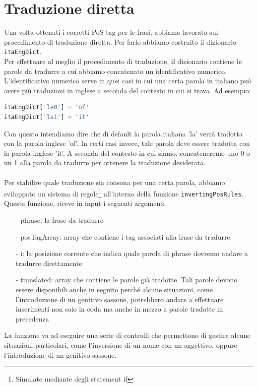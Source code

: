 \documentclass[10pt]{article}
\begin{document}
\section{Traduzione diretta}
Una volta ottenuti i corretti PoS tag per le frasi, abbiamo lavorato sul procedimento di traduzione diretta. Per farlo abbiamo costruito il dizionario \texttt{itaEngDict}.\\
Per effettuare al meglio il procedimento di traduzione, il dizionario contiene le parole da tradurre a cui abbiamo concatenato un identificativo numerico. L'identificativo numerico serve in quei casi in cui una certa parola in italiano può avere più traduzioni in inglese a seconda del contesto in cui si trova. Ad esempio:
\begin{lstlisting}[language=Python]
itaEngDict['la0'] = 'of'
itaEngDict['la1'] = 'it'
\end{lstlisting}
Con questo intendiamo dire che di default la parola italiana 'la' verrà tradotta con la parola inglese 'of'. In certi casi invece, tale parola deve essere tradotta con la parola inglese 'it'. A seconda del contesto in cui siamo, concateneremo uno 0 o un 1 alla parola da tradurre per ottenere la traduzione desiderata.\\
\\
Per stabilire quale traduzione sia consona per una certa parola, abbiamo sviluppato un sistema di regole\footnote{Simulate mediante degli statement if} all'interno della funzione \texttt{invertingPosRules}. Questa funzione, riceve in input i seguenti argomenti
\begin{itemize}
	\item[-] phrase: la frase da tradurre
	\item[-] posTagArray: array che contiene i tag associati alla frase da tradurre
	\item[-] i: la posizione corrente che indica quale parola di phrase dovremo andare a tradurre direttamente
	\item[-] translated: array che contiene le parole già tradotte. Tali parole devono essere disponibili anche in seguito perché alcune situazioni, come l'introduzione di un genitivo sassone, potrebbero andare a effettuare inserimenti non solo in coda ma anche in mezzo a parole tradotte in precedenza
\end{itemize}
La funzione va ad eseguire una serie di controlli che permettono di gestire alcune situazioni particolari, come l'inversione di un nome con un aggettivo, oppure l'introduzione di un genitivo sassone.\\
\end{document}
